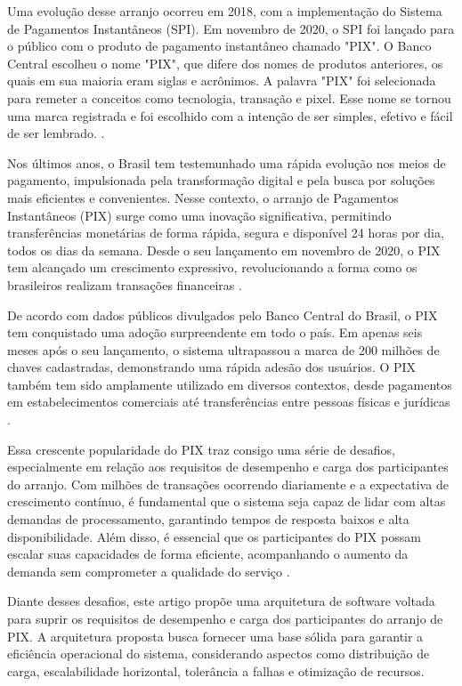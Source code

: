 \documentclass[12pt]{article}
\begin{document}
Uma evolução desse arranjo ocorreu em 2018, com a implementação do Sistema de Pagamentos Instantâneos (SPI). Em novembro de 2020, o SPI foi lançado para o público com o produto de pagamento instantâneo chamado "PIX". O Banco Central escolheu o nome "PIX", que difere dos nomes de produtos anteriores, os quais em sua maioria eram siglas e acrônimos. A palavra "PIX" foi selecionada para remeter a conceitos como tecnologia, transação e pixel. Esse nome se tornou uma marca registrada e foi escolhido com a intenção de ser simples, efetivo e fácil de ser lembrado. \cite{Soares_2022}.

Nos últimos anos, o Brasil tem testemunhado uma rápida evolução nos meios de pagamento, impulsionada pela transformação digital e pela busca por soluções mais eficientes e convenientes. Nesse contexto, o arranjo de Pagamentos Instantâneos (PIX) surge como uma inovação significativa, permitindo transferências monetárias de forma rápida, segura e disponível 24 horas por dia, todos os dias da semana. Desde o seu lançamento em novembro de 2020, o PIX tem alcançado um crescimento expressivo, revolucionando a forma como os brasileiros realizam transações financeiras \cite{holanda2021entrada}.

De acordo com dados públicos divulgados pelo Banco Central do Brasil, o PIX tem conquistado uma adoção surpreendente em todo o país. Em apenas seis meses após o seu lançamento, o sistema ultrapassou a marca de 200 milhões de chaves cadastradas, demonstrando uma rápida adesão dos usuários. O PIX também tem sido amplamente utilizado em diversos contextos, desde pagamentos em estabelecimentos comerciais até transferências entre pessoas físicas e jurídicas \cite{Rimonato_Santos_2021}.



Essa crescente popularidade do PIX traz consigo uma série de desafios, especialmente em relação aos requisitos de desempenho e carga dos participantes do arranjo. Com milhões de transações ocorrendo diariamente e a expectativa de crescimento contínuo, é fundamental que o sistema seja capaz de lidar com altas demandas de processamento, garantindo tempos de resposta baixos e alta disponibilidade. Além disso, é essencial que os participantes do PIX possam escalar suas capacidades de forma eficiente, acompanhando o aumento da demanda sem comprometer a qualidade do serviço \cite{neves2021pontuais}.

Diante desses desafios, este artigo propõe uma arquitetura de software voltada para suprir os requisitos de desempenho e carga dos participantes do arranjo de PIX. A arquitetura proposta busca fornecer uma base sólida para garantir a eficiência operacional do sistema, considerando aspectos como distribuição de carga, escalabilidade horizontal, tolerância a falhas e otimização de recursos.
\end{document}
